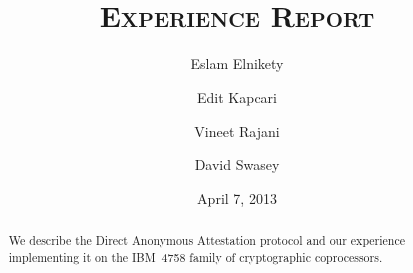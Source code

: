\documentclass[a4paper]{article}
\title{\TITLE \\
	{\small\textsc{Experience Report}}%
}
\author{Eslam Elnikety \and Edit Kapcari \and Vineet Rajani \and David Swasey}
\date{April 7, 2013}
\begin{document}
\maketitle

\begin{abstract}
We describe the Direct Anonymous Attestation protocol
and our experience implementing it on the IBM~4758 family
of cryptographic coprocessors.
\end{abstract}






\appendix

\end{document}
